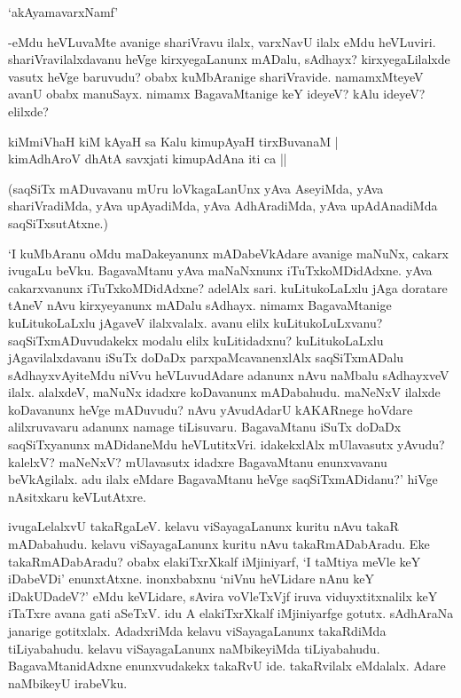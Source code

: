\begin{shloka}
`akAyamavarxNamf'
\end{shloka}

-eMdu heVLuvaMte avanige shariVravu ilalx, varxNavU ilalx eMdu heVLuviri. shariVravilalxdavanu heVge kirxyegaLanunx mADalu, sAdhayx? kirxyegaLilalxde vasutx heVge baruvudu? obabx kuMbAranige shariVravide. namamxMteyeV avanU obabx manuSayx. nimamx BagavaMtanige keY ideyeV? kAlu ideyeV? elilxde?

\begin{shloka}
kiMmiVhaH kiM kAyaH sa Kalu kimupAyaH tirxBuvanaM |\\
kimAdhAroV dhAtA savxjati kimupAdAna iti ca ||
\end{shloka}

(saqSiTx mADuvavanu mUru loVkagaLanUnx yAva AseyiMda, yAva shariVradiMda, yAva upAyadiMda, yAva AdhAradiMda, yAva upAdAnadiMda saqSiTxsutAtxne.)

`I kuMbAranu oMdu maDakeyanunx mADabeVkAdare avanige maNuNx, cakarx ivugaLu beVku. BagavaMtanu yAva maNaNxnunx iTuTxkoMDidAdxne. yAva cakarxvanunx iTuTxkoMDidAdxne? adelAlx sari. kuLitukoLaLxlu jAga doratare tAneV nAvu kirxyeyanunx mADalu sAdhayx. nimamx BagavaMtanige kuLitukoLaLxlu jAgaveV ilalxvalalx. avanu elilx kuLitukoLuLxvanu? saqSiTxmADuvudakekx modalu elilx kuLitidadxnu? kuLitukoLaLxlu jAgavilalxdavanu iSuTx doDaDx parxpaMcavanenxlAlx saqSiTxmADalu sAdhayxvAyiteMdu niVvu heVLuvudAdare adanunx nAvu naMbalu sAdhayxveV ilalx. alalxdeV, maNuNx idadxre koDavanunx mADabahudu. maNeNxV ilalxde koDavanunx heVge mADuvudu? nAvu yAvudAdarU kAKARnege hoVdare alilxruvavaru adanunx namage tiLisuvaru. BagavaMtanu iSuTx doDaDx saqSiTxyanunx mADidaneMdu heVLutitxVri. idakekxlAlx mUlavasutx yAvudu? kalelxV? maNeNxV? mUlavasutx idadxre BagavaMtanu enunxvavanu beVkAgilalx. adu ilalx eMdare BagavaMtanu heVge saqSiTxmADidanu?' hiVge nAsitxkaru keVLutAtxre.

ivugaLelalxvU takaRgaLeV. kelavu viSayagaLanunx kuritu nAvu takaR mADabahudu. kelavu viSayagaLanunx kuritu nAvu takaRmADabAradu. Eke takaRmADabAradu? obabx elakiTxrXkalf iMjiniyarf, `I taMtiya meVle keY iDabeVDi' enunxtAtxne. inonxbabxnu `niVnu heVLidare nAnu keY iDakUDadeV?' eMdu keVLidare, sAvira voVleTxVjf iruva viduyxtitxnalilx keY iTaTxre avana gati aSeTxV. idu A elakiTxrXkalf iMjiniyarfge gotutx. sAdhAraNa janarige gotitxlalx. AdadxriMda kelavu viSayagaLanunx takaRdiMda tiLiyabahudu. kelavu viSayagaLanunx naMbikeyiMda tiLiyabahudu. BagavaMtanidAdxne enunxvudakekx takaRvU ide. takaRvilalx eMdalalx. Adare naMbikeyU irabeVku.

